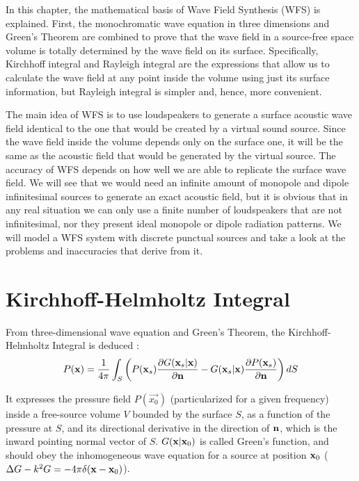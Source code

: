 In this chapter, the mathematical basis of Wave Field Synthesis (WFS) is explained. First, the monochromatic wave equation in three dimensions and Green's Theorem are combined to prove that the wave field in a source-free space volume is totally determined by the wave field on its surface. Specifically, Kirchhoff integral and Rayleigh integral are the expressions that allow us to calculate the wave field at any point inside the volume using just its surface information, but Rayleigh integral is simpler and, hence, more convenient. %

The main idea of WFS is to use loudspeakers to generate a surface acoustic wave field identical to the one that would be created by a virtual sound source. Since the wave field inside the volume depends only on the surface one, it will be the same as the acoustic field that would be generated by the virtual source. The accuracy of WFS depends on how well we are able to replicate the surface wave field. We will see that we would need an infinite amount of monopole and dipole infinitesimal sources to generate an exact acoustic field, but it is obvious that in any real situation we can only use a finite number of loudspeakers that are not infinitesimal, nor they present ideal monopole or dipole radiation patterns. We will model a WFS system with discrete punctual sources and take a look at the problems and inaccuracies that derive from it.

\section{Kirchhoff-Helmholtz Integral}
From three-dimensional wave equation and Green's Theorem, the Kirchhoff-Helmholtz Integral is deduced \cite{BerkhoutSeismic} \cite{Verheijen}:
\begin{equation}
P(\PosTheo) = \frac{1}{4\pi} \int_{S} \left(P(\PosTheo[surface])\frac{\partial G(\PosTheo[surface]\vert \PosTheo)}{\partial \mathbf{n}} - G(\PosTheo[surface]\vert \PosTheo) \frac{\partial P(\PosTheo[surface])}{\partial \mathbf{n}} \right) dS
\label{KirchhoffHelmholtz}
\end{equation}

It expresses the pressure field $P(\vec{x_0})$ (particularized for a given frequency) inside a free-source volume $V$ bounded by the surface $S$, as a function of the pressure at $S$, and its directional derivative in the direction of $\mathbf{n}$, which is the inward pointing normal vector of $S$. $G(\PosTheo \vert \PosTheo_0)$ is called Green's function, and should obey the inhomogeneous wave equation for a source at position $\PosTheo_0$ ($\Delta G - k^2 G = -4\pi\delta(\PosTheo - \PosTheo_0)$).

